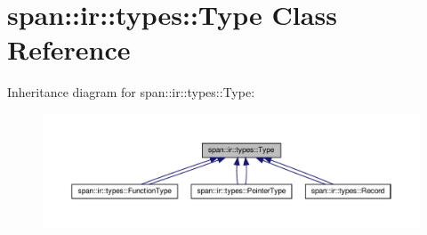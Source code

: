 \hypertarget{classspan_1_1ir_1_1types_1_1Type}{}\section{span\+:\+:ir\+:\+:types\+:\+:Type Class Reference}
\label{classspan_1_1ir_1_1types_1_1Type}


Inheritance diagram for span\+:\+:ir\+:\+:types\+:\+:Type\+:\nopagebreak
\begin{figure}[H]
\begin{center}
\leavevmode
\includegraphics[width=350pt]{classspan_1_1ir_1_1types_1_1Type__inherit__graph}
\end{center}
\end{figure}
